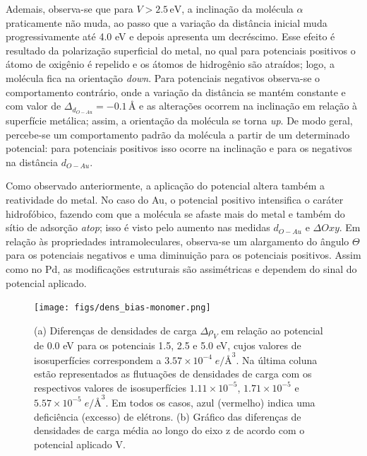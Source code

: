 Ademais, observa-se que para $ V>2.5 \,\si{\eV} $, a inclinação da molécula $ \alpha $ praticamente não muda, ao passo que a variação da distância inicial muda progressivamente até 4.0 eV e depois apresenta um decréscimo. Esse efeito é resultado da polarização superficial do metal, no qual para potenciais positivos o átomo de oxigênio é repelido e os átomos de hidrogênio são atraídos; logo, a molécula fica na orientação \textit{down}. Para potenciais negativos observa-se o comportamento contrário, onde a variação da distância se mantém constante e com valor de $\Delta_{d_{O-Au}}= -0.1 \,\si{\angstrom} $ e as alterações ocorrem na inclinação em relação à superfície metálica; assim, a orientação da molécula se torna \textit{up}. De modo geral, percebe-se um comportamento padrão da molécula a partir de um determinado potencial: para potenciais positivos isso ocorre na inclinação e para os negativos na distância $ d_{O-Au} $.  

Como observado anteriormente, a aplicação do potencial altera também a reatividade do metal. No caso do Au, o potencial positivo intensifica o caráter hidrofóbico, fazendo com que a molécula se afaste mais do metal e também do sítio de adsorção \textit{atop}; isso é visto pelo aumento nas medidas $ d_{O-Au} $ e $ \Delta Oxy $. Em relação às propriedades intramoleculares, observa-se um alargamento do ângulo $ \Theta $ para os potenciais negativos e uma diminuição para os potenciais positivos. Assim como no Pd, as modificações estruturais são assimétricas e dependem do sinal do potencial aplicado. %
 \begin{figure}[b!]
	\centering
	\caption{(a) Diferenças de densidades de carga $ \Delta \rho_{V} $ em relação ao potencial de 0.0 eV para os potenciais 1.5, 2.5 e 5.0 eV, cujos valores de isosuperfícies correspondem a $ 3.57\times10^{-4}\;\si{e}/\si{\angstrom}^3 $. Na última coluna estão representados as flutuações de densidades de carga com os respectivos valores de isosuperfícies $ 1.11\times10^{-5}$, $ 1.71\times10^{-5}$ e $ 5.57\times10^{-5}\;\si{e}/\si{\angstrom}^3 $. Em todos os casos, azul (vermelho) indica uma deficiência (excesso) de elétrons. (b) Gráfico das diferenças de densidades de carga média ao longo do eixo z de acordo com o potencial aplicado V.}
	\label{fig:neq_au_mon_dens}
	\texttt{[image: figs/dens\_bias-monomer.png]}
\end{figure}


